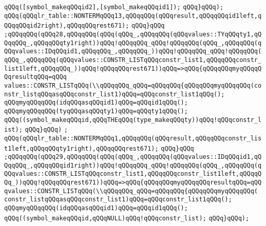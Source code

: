 \newline
\verb|qQQq([symbol_makeqQQqid2],[symbol_makeqQQqid1]);|\newline
\verb|qQQq}qQQq);|\newline
\verb|qQQq(qQQqlr_table::NONTERMqQQq13,qQQqqQQq(qQQqresult,qQQqqQQqid1left,qQQqqQQqid2right),qQQqqQQqrest671);|\newline
\verb|qQQq}qQQq|\newline
\verb|;qQQqqQQq(qQQq28,qQQqqQQq(qQQq(qQQq_,qQQqqQQq(qQQqvalues::TYqQQqty1,qQQqqQQq_,qQQqqQQqty1right))qQQq!qQQqqQQq_qQQq!qQQqqQQq(qQQq_,qQQqqQQq(qQQqvalues::IDqQQqid1,qQQqqQQq_,qQQqqQQq_))qQQq!qQQqqQQq_qQQq!qQQqqQQq(qQQq_,qQQqqQQq(qQQqvalues::CONSTR_LISTqQQqconstr_list1,qQQqqQQqconstr_list1left,qQQqqQQq_))qQQq!qQQqqQQqrest671))qQQq=>qQQq{qQQqqQQqmyqQQqqQQqresultqQQq=qQQq|\newline
\verb|values::CONSTR_LISTqQQq(\\qQQqqQQq_qQQq=qQQqqQQq{qQQqqQQqmyqQQqqQQq(constr_listqQQqasqQQqconstr_list1)qQQq=qQQqconstr_list1qQQq();|\newline
\verb|qQQqmyqQQqqQQq(idqQQqasqQQqid1)qQQq=qQQqid1qQQq();|\newline
\verb|qQQqmyqQQqqQQq(tyqQQqasqQQqty1)qQQq=qQQqty1qQQq();|\newline
\verb|qQQq((symbol_makeqQQqid,qQQqTHEqQQq(type_makeqQQqty))qQQq!qQQqconstr_list);|\newline
\verb|qQQq}qQQq)|\newline
\verb|;|\newline
\verb|qQQq(qQQqlr_table::NONTERMqQQq1,qQQqqQQq(qQQqresult,qQQqqQQqconstr_list1left,qQQqqQQqty1right),qQQqqQQqrest671);|\newline
\verb|qQQq}qQQq|\newline
\verb|;qQQqqQQq(qQQq29,qQQqqQQq(qQQq(qQQq_,qQQqqQQq(qQQqvalues::IDqQQqid1,qQQqqQQq_,qQQqqQQqid1right))qQQq!qQQqqQQq_qQQq!qQQqqQQq(qQQq_,qQQqqQQq(qQQqvalues::CONSTR_LISTqQQqconstr_list1,qQQqqQQqconstr_list1left,qQQqqQQq_))qQQq!qQQqqQQqrest671))qQQq=>qQQq{qQQqqQQqmyqQQqqQQqresultqQQq=qQQqvalues::CONSTR_LISTqQQq(\\qQQqqQQq_qQQq=qQQqqQQq{qQQqqQQqmyqQQqqQQq(|\newline
\verb|constr_listqQQqasqQQqconstr_list1)qQQq=qQQqconstr_list1qQQq();|\newline
\verb|qQQqmyqQQqqQQq(idqQQqasqQQqid1)qQQq=qQQqid1qQQq();|\newline
\verb|qQQq((symbol_makeqQQqid,qQQqNULL)qQQq!qQQqconstr_list);|\newline
\verb|qQQq}qQQq);|\newline
